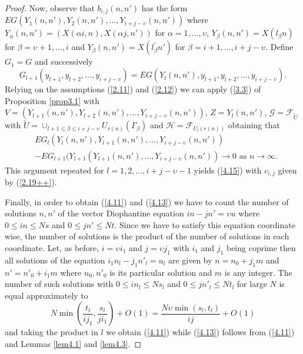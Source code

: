 \begin{proof}
Now, observe that $b_{i,j}(n,n')$ has the form $EG(Y_1(n,n'),Y_2(n,n'),...,
Y_{i+j-{{\upsilon}}}(n,n'))$ where $Y_{{\alpha}}(n,n')=(X({{\alpha}} i,n),X({{\alpha}} j,n'))$ for 
${{\alpha}}=1,...,{{\upsilon}}$, $Y_{{\beta}}(n,n')=X(l_{{\beta}} n)$ for ${{\beta}}={{\upsilon}}+1,...,i$ and
$Y_{{\beta}}(n,n')=X(l^\prime_{{\beta}} n')$ for ${{\beta}}=i+1,...,i+j-{{\upsilon}}$. Define $G_1=G$ 
and successively
\[
G_{l+1}(y_{l+1},y_{l+2},...,y_{i+j-{{\upsilon}}})=EG(Y_l(n,n'),y_{l+1},y_{l+2},...,
y_{i+j-{{\upsilon}}}).
\]
Relying on the assumptions (\ref{2.11}) and (\ref{2.12}) we can apply 
(\ref{3.3}) of Proposition \ref{prop3.1} with $V=(Y_{l+1}(n,n'),Y_{l+2}(n,n'),...,
Y_{i+j-{{\upsilon}}}(n,n'))$, $Z=Y_l(n,n')$, ${{\mathcal G}}={{\mathcal F}}_{\tilde U}$ with $\tilde U=
\cup_{l+1\leq{{\beta}}\leq i+j-{{\upsilon}}}U_{r(n)}({{\Gamma}}_{{\beta}})$ and ${{\mathcal H}}={{\mathcal F}}_{U_l(r(n))}$ 
obtaining that
\begin{eqnarray*}
&EG_l(Y_l(n,n'), Y_{l+1}(n,n'),...,Y_{i+j-{{\upsilon}}}(n,n'))\\
&-EG_{l+1}(Y_{l+1}
(Y_{l+1}(n,n'),...,Y_{i+j-{{\upsilon}}}(n,n'))\to 0\,\,\mbox{as}\,\, n\to\infty.
\end{eqnarray*}
This argument repeated for $l=1,2,...,i+j-{{\upsilon}}-1$ yields (\ref{4.15})
with $c_{i,j}$ given by (\ref{2.19++}).

Finally, in order to obtain (\ref{4.11}) and (\ref{4.13}) we have to 
count the number of solutions $n,n'$ of the vector Diophantine equation
$in-jn'={{\upsilon}} u$ where $0\leq in\leq Ns$ and $0\leq jn'\leq Nt$. Since we
have to satisfy this equation coordinate wise, the number of solutions is
the product of the number of solutions in each coordinate. 
Let, as before, $i={{\upsilon}} i_1$ and $j={{\upsilon}} j_1$ with $i_1$ and $j_1$ being 
coprime then all solutions
of the equation $i_1n_l-j_1{n'}_l=u_l$ are given by $n=n_0+j_1m$ and $n'=
n'_0+i_1m$ where $n_0,n'_0$ is its particular solution and $m$ is any integer.
The number of such solutions with $0\leq in_l\leq Ns_l$ and $0\le j{n'}_l
\le Nt_l$ for large $N$ is equal approximately to
\[
N\min(\frac {t_l}{ij_1},\frac {s_l}{ji_1})+O(1)=\frac {N{{\upsilon}}\min(s_l,t_l)}{ij}+O(1)
\]
and taking the product in $l$ we obtain (\ref{4.11}) while (\ref{4.13}) follows
from (\ref{4.11}) and Lemmas \ref{lem4.1} and \ref{lem4.3}.
\end{proof}

